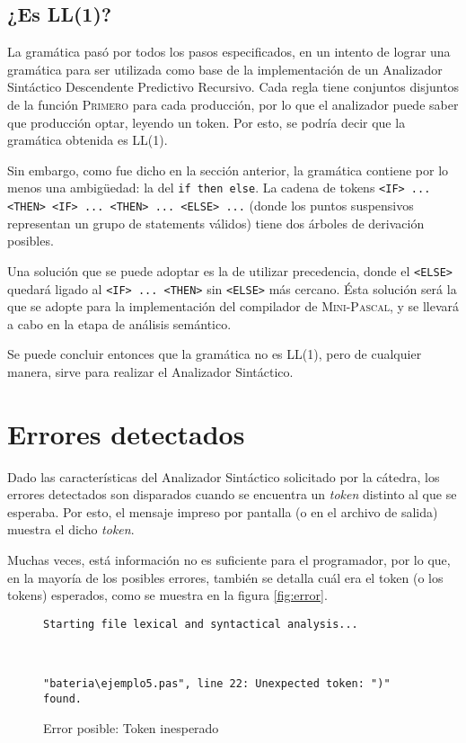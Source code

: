 \documentclass[a4paper,oneside]{report}
\begin{document}
\section{¿Es LL(1)?}
La gramática pasó por todos los pasos especificados, en un intento de lograr una gramática para ser utilizada como base de la implementación de un Analizador Sintáctico Descendente Predictivo Recursivo. Cada regla tiene conjuntos disjuntos de la función \textsc{Primero} para cada producción, por lo que el analizador puede saber que producción optar, leyendo un token. Por esto, se podría decir que la gramática obtenida es LL(1).

Sin embargo, como fue dicho en la sección anterior, la gramática contiene por lo menos una ambigüedad: la del \verb|if then else|. La cadena de tokens \verb|<IF> ... <THEN> <IF> ... <THEN> ... <ELSE> ...| (donde los puntos suspensivos representan un grupo de statements válidos) tiene dos árboles de derivación posibles. 

Una solución que se puede adoptar es la de utilizar precedencia, donde el \verb|<ELSE>| quedará ligado al \verb|<IF> ... <THEN>| sin \verb|<ELSE>| más cercano. Ésta solución será la que se adopte para la implementación del compilador de \textsc{Mini-Pascal}, y se llevará a cabo en la etapa de análisis semántico.

Se puede concluir entonces que la gramática no es LL(1), pero de cualquier manera, sirve para realizar el Analizador Sintáctico.

\chapter{Errores detectados}
Dado las características del Analizador Sintáctico solicitado por la cátedra, los errores detectados son disparados cuando se encuentra un \textit{token} distinto al que se esperaba. Por esto, el mensaje impreso por pantalla (o en el archivo de salida) muestra el dicho \textit{token}.

Muchas veces, está información no es suficiente para el programador, por lo que, en la mayoría de los posibles errores, también se detalla cuál era el token (o los tokens) esperados, como se muestra en la figura \ref{fig:error}.


\begin{figure}[h]
\begin{verbatim}
Starting file lexical and syntactical analysis...



"bateria\ejemplo5.pas", line 22: Unexpected token: ")" found.
\end{verbatim}
\label{fig:error2}
\caption{Error posible: Token inesperado}
\end{figure}
\end{document}

